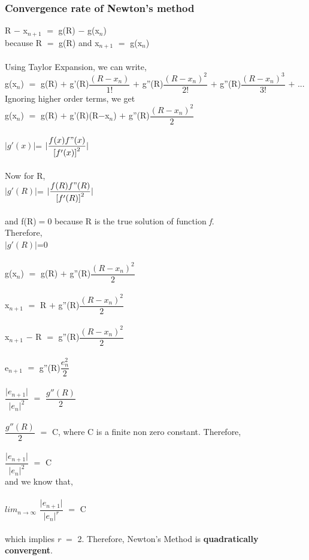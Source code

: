 \documentclass[15pt]{report}
\begin{document}
\subsubsection*{Convergence rate of Newton's method}
R $-$ x$_{n+1}$ $=$ g(R) $-$ g(x$_{n}$)\\
because R $=$ g(R) and x$_{n+1}$ $=$ g(x$_{n}$)\\ \\
Using Taylor Expansion, we can write,\\
g(x$_{n}$) $=$ g(R) $+$ g'(R)$\dfrac{(R-x_{n})}{1!}$ $+$ g''(R)$\dfrac{(R-x_{n})^{2}}{2!}$ $+$ g''(R)$\dfrac{(R-x_{n})^{3}}{3!}$ $+$ ... \\
Ignoring higher order terms, we get\\
g(x$_{n}$) $=$ g(R) $+$ g'(R)(R$-$x$_{n}$) $+$ g''(R)$\dfrac{(R-x_{n})^{2}}{2}$\\ \\
$\vert g'(x) \vert$= $\vert\dfrac{f(x)f"(x)}{{[f'(x)]}^2  }\vert$\\ \\
Now for R,\\ 
$\vert g'(R) \vert$= $\vert\dfrac{f(R)f"(R)}{{[f'(R)]}^2  }\vert$\\ \\
and f(R)$=$0 because R is the true solution of function \textit{f}.\\
Therefore,\\ 
$\vert g'(R) \vert$=0 \\ \\
g(x$_{n}$) $=$ g(R) $+$ g''(R)$\dfrac{(R-x_{n})^{2}}{2}$\\ \\
x$_{n+1}$ $=$ R $+$ g''(R)$\dfrac{(R-x_{n})^{2}}{2}$\\ \\
x$_{n+1}$ $-$ R $=$ g''(R)$\dfrac{(R-x_{n})^{2}}{2}$\\ \\
e$_{n+1}$ $=$ g''(R)$\dfrac{e_{n}^{2}}{2}$\\ \\
$\dfrac{\vert e_{n+1} \vert}{\vert e_{n}\vert^{2}}$ $=$ $\dfrac{g''(R)}{2}$\\ \\
$\dfrac{g''(R)}{2}$ $=$ C, where C is a finite non zero constant.
Therefore,\\ \\
$\dfrac{\vert e_{n+1} \vert}{\vert e_{n}\vert^{2}}$ $=$ C\\
and we know that,\\ \\
$lim_{n\rightarrow \infty}$ $\dfrac{\vert e_{n+1}\vert}{{\vert e_{n} \vert}^r}$ $=$ C \\ \\
which implies \textit{r} $=$ 2. Therefore, Newton's Method is \textbf{quadratically convergent}. 
\newpage
\end{document}
